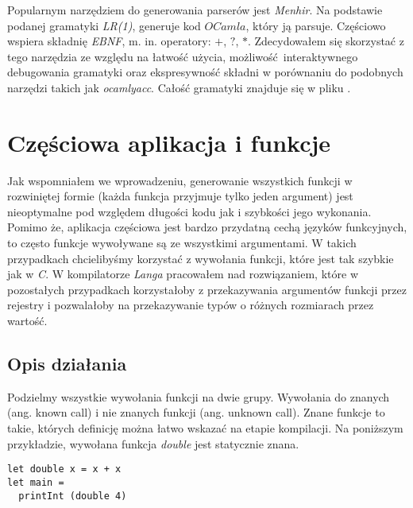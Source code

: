 \documentclass[declaration,shortabstract]{iithesis}
\begin{document}
Popularnym narzędziem do generowania parserów jest \textit{Menhir}. Na 
\newline podstawie podanej gramatyki \textit{LR(1)}, generuje kod $OCamla$, 
który ją parsuje. Częściowo wspiera składnię \textit{EBNF}, m. in. operatory: $
+$, $?$, $\ast$. Zdecydowałem się skorzystać z tego narzędzia ze względu na 
łatwość użycia, możliwość interaktywnego debugowania gramatyki oraz 
ekspresywność składni w porównaniu do podobnych narzędzi takich jak \textit
{ocamlyacc}. Całość gramatyki znajduje się w pliku 
. 

\section{Częściowa aplikacja i funkcje}

Jak wspomniałem we wprowadzeniu, generowanie wszystkich funkcji w rozwiniętej 
formie (każda funkcja przyjmuje tylko jeden argument) jest nieoptymalne pod
względem długości kodu jak i szybkości jego wykonania. Pomimo że, aplikacja 
częściowa jest bardzo przydatną cechą języków funkcyjnych, to często funkcje
wywoływane są ze wszystkimi argumentami. W takich przypadkach chcielibyśmy 
korzystać z wywołania funkcji, które jest tak szybkie jak w \textit{C}. 
W kompilatorze \textit{Langa} pracowałem nad rozwiązaniem, które w pozostałych 
przypadkach korzystałoby z przekazywania argumentów funkcji przez rejestry i 
pozwalałoby na przekazywanie typów o różnych rozmiarach przez wartość. 

\subsection{Opis działania}

Podzielmy wszystkie wywołania funkcji na dwie grupy. Wywołania do znanych 
(ang. known call) i nie znanych funkcji (ang. unknown call). Znane funkcje to 
takie, których definicję można łatwo wskazać na etapie kompilacji. 
Na poniższym przykładzie, wywołana funkcja \textit{double} jest statycznie znana.

\begin{lstlisting}[frame=single, caption=Wywołanie statycznie znanej funkcji.] 
let double x = x + x
let main = 
  printInt (double 4)
\end{lstlisting}
\end{document}
